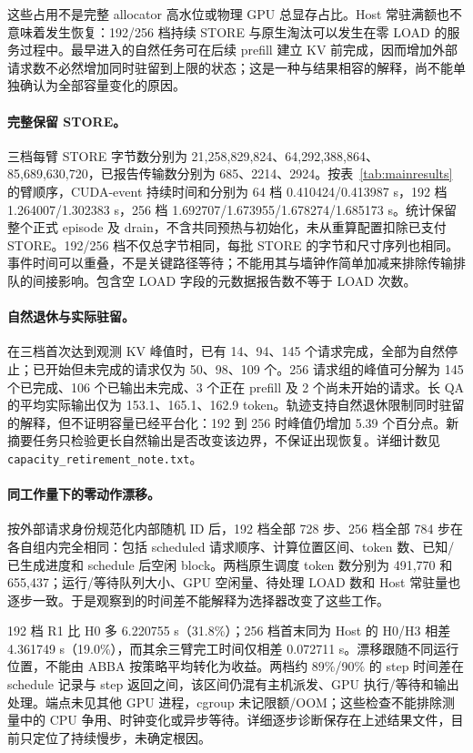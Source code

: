 \documentclass[UTF8,fontset=fandol,a4paper,10pt]{ctexart}
\newcommand{\code}[1]{\nolinkurl{#1}}
\begin{document}
这些占用不是完整 allocator 高水位或物理 GPU 总显存占比。Host 常驻满额也不意味着发生恢复：192/256 档持续 STORE 与原生淘汰可以发生在零 LOAD 的服务过程中。最早进入的自然任务可在后续 prefill 建立 KV 前完成，因而增加外部请求数不必然增加同时驻留到上限的状态；这是一种与结果相容的解释，尚不能单独确认为全部容量变化的原因。

\paragraph{完整保留 STORE。}
三档每臂 STORE 字节数分别为 21,258,829,824、64,292,388,864、85,689,630,720，已报告传输数分别为 685、2214、2924。按表~\ref{tab:mainresults} 的臂顺序，CUDA-event 持续时间和分别为 64 档 0.410424/0.413987 s，192 档 1.264007/1.302383 s，256 档 1.692707/1.673955/1.678274/1.685173 s。统计保留整个正式 episode 及 drain，不含共同预热与初始化，未从重算配置扣除已支付 STORE。192/256 档不仅总字节相同，每批 STORE 的字节和尺寸序列也相同。事件时间可以重叠，不是关键路径等待；不能用其与墙钟作简单加减来排除传输排队的间接影响。包含空 LOAD 字段的元数据报告数不等于 LOAD 次数。

\paragraph{自然退休与实际驻留。}
在三档首次达到观测 KV 峰值时，已有 14、94、145 个请求完成，全部为自然停止；已开始但未完成的请求仅为 50、98、109 个。256 请求组的峰值可分解为 145 个已完成、106 个已输出未完成、3 个正在 prefill 及 2 个尚未开始的请求。长 QA 的平均实际输出仅为 153.1、165.1、162.9 token。轨迹支持自然退休限制同时驻留的解释，但不证明容量已经平台化：192 到 256 时峰值仍增加 5.39 个百分点。新摘要任务只检验更长自然输出是否改变该边界，不保证出现恢复。详细计数见 \code{capacity_retirement_note.txt}。

\paragraph{同工作量下的零动作漂移。}
按外部请求身份规范化内部随机 ID 后，192 档全部 728 步、256 档全部 784 步在各自组内完全相同：包括 scheduled 请求顺序、计算位置区间、token 数、已知/已生成进度和 schedule 后空闲 block。两档原生调度 token 数分别为 491,770 和 655,437；运行/等待队列大小、GPU 空闲量、待处理 LOAD 数和 Host 常驻量也逐步一致。于是观察到的时间差不能解释为选择器改变了这些工作。

192 档 R1 比 H0 多 6.220755 s（31.8\%）；256 档首末同为 Host 的 H0/H3 相差 4.361749 s（19.0\%），而其余三臂完工时间仅相差 0.072711 s。漂移跟随不同运行位置，不能由 ABBA 按策略平均转化为收益。两档约 89\%/90\% 的 step 时间差在 schedule 记录与 step 返回之间，该区间仍混有主机派发、GPU 执行/等待和输出处理。端点未见其他 GPU 进程，cgroup 未记限额/OOM；这些检查不能排除测量中的 CPU 争用、时钟变化或异步等待。详细逐步诊断保存在上述结果文件，目前只定位了持续慢步，未确定根因。
\end{document}
